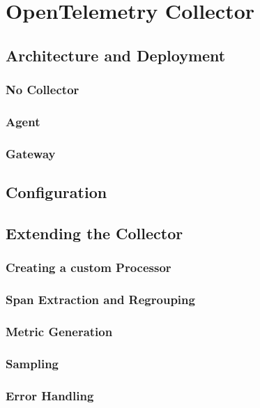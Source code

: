 \chapter{OpenTelemetry Collector}
\label{chap:collector}

\section{Architecture and Deployment}
\label{sec:c_architecture_and_deployment}

\subsection{No Collector}
\subsection{Agent}
\subsection{Gateway}

\section{Configuration}
\label{sec:c_configuration}

\section{Extending the Collector}
\label{sec:c_extending_the_collector}

\subsection{Creating a custom Processor}
\subsection{Span Extraction and Regrouping}
\subsection{Metric Generation}
\subsection{Sampling}
\subsection{Error Handling}